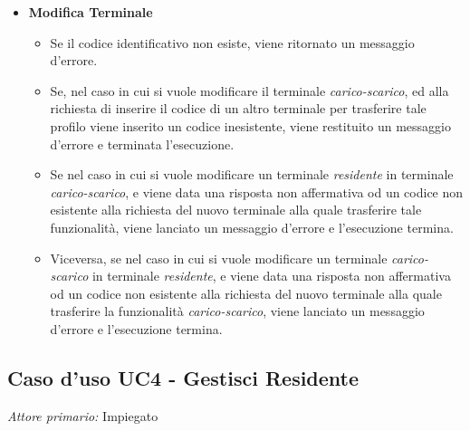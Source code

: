 \documentclass[12pt, letterpaper]{article}
\begin{document}
\begin{itemize}
    \begin{itemize}
        \item \textbf{Modifica Terminale}
        \begin{itemize}
            \item Se il codice identificativo non esiste, viene ritornato un messaggio d'errore.  
            \item Se, nel caso in cui si vuole modificare il terminale \emph{carico-scarico}, ed alla richiesta di inserire il codice di un altro terminale per trasferire tale profilo viene inserito un codice inesistente, viene restituito un messaggio d'errore e terminata l'esecuzione.  
            \item Se nel caso in cui si vuole modificare un terminale \emph{residente} in terminale \emph{carico-scarico}, e viene data una risposta non affermativa od un codice non esistente alla richiesta del nuovo terminale alla quale trasferire tale funzionalità, viene lanciato un messaggio d'errore e l'esecuzione termina.
            \item Viceversa, se nel caso in cui si vuole modificare un terminale \emph{carico-scarico} in terminale \emph{residente}, e viene data una risposta non affermativa od un codice non esistente alla richiesta del nuovo terminale alla quale trasferire la funzionalità \emph{carico-scarico}, viene lanciato un messaggio d'errore e l'esecuzione termina.
        \end{itemize}
    \end{itemize}
\end{itemize}


\subsection{Caso d'uso UC4 - Gestisci Residente}

\emph{Attore primario: } Impiegato
\end{document}
